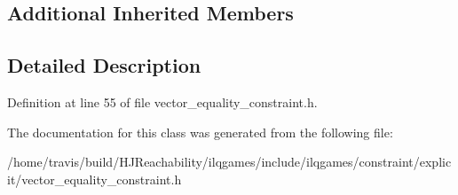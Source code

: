 \subsection*{Additional Inherited Members}


\subsection{Detailed Description}


Definition at line 55 of file vector\+\_\+equality\+\_\+constraint.\+h.



The documentation for this class was generated from the following file\+:\begin{DoxyCompactItemize}
\item 
/home/travis/build/\+H\+J\+Reachability/ilqgames/include/ilqgames/constraint/explicit/vector\+\_\+equality\+\_\+constraint.\+h\end{DoxyCompactItemize}
